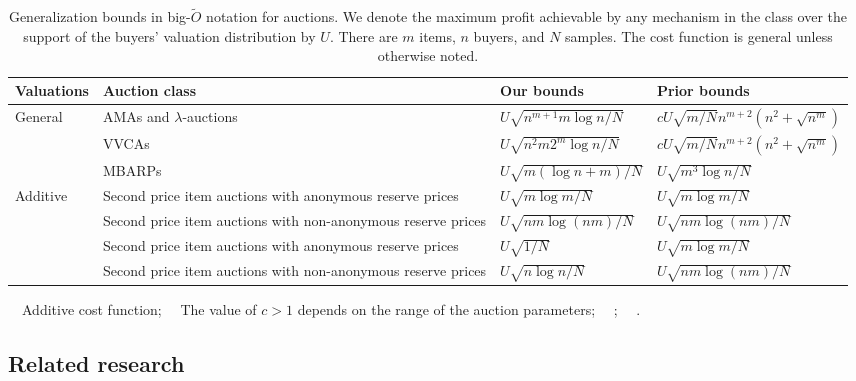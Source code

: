 \begin{table}
	\scriptsize
	\begin{tabularx}{\textwidth}{L{1} L{1} L{.9} L{1.1}}
		\toprule
		\textbf{Valuations} & \textbf{Auction class} & \textbf{Our bounds} & \textbf{Prior bounds}\\\midrule
		General & AMAs and $\lambda$-auctions & $U\sqrt{n^{m+1}m\log n/N}$ & $cU\sqrt{m/N} n^{m+2}\left(n^2 + \sqrt{n^m}\right)$\footnotemark[5]\footnotemark[6]\\
		& VVCAs & $U\sqrt{n^2m2^m\log n/N}$ & $cU\sqrt{m/N} n^{m+2}\left(n^2 + \sqrt{n^m}\right)$\footnotemark[5]\footnotemark[6]\\
		&MBARPs &$U \sqrt{m(\log n + m)/N}$&$U \sqrt{m^3 \log n/N}$\footnotemark[5]\\\midrule
		Additive & Second price item auctions with anonymous reserve prices &$U\sqrt{m \log m/N}$ &$U\sqrt{m \log m/N}$\footnotemark[4]\\
		& Second price item auctions with non-anonymous reserve prices &$U\sqrt{nm \log (nm)/N} $ &$U\sqrt{nm \log (nm)/N}$\footnotemark[4]\\\midrule
		 & Second price item auctions with anonymous reserve prices &$U\sqrt{1/N}$ &$U\sqrt{m \log m/N}$\footnotemark[4]\\
		& Second price item auctions with non-anonymous reserve prices &$U\sqrt{n \log n/N} $ &$U\sqrt{nm \log (nm)/N}$\footnotemark[4]\\\bottomrule
	\end{tabularx}
	\noindent\par
	{\center
		\scriptsize
		\footnotemark[1]~~{Additive cost function};\quad
		\footnotemark[6]~~{The value of $c > 1$ depends on the range of the auction parameters};\quad
		\footnotemark[4]~~{\citet{Morgenstern16:Learning}};\quad
		\footnotemark[5]~~{\citet{Balcan16:Sample}}.
	}
	\caption{Generalization bounds in big-$\tilde O$ notation for auctions. We denote the maximum profit achievable by any mechanism in the class over the support of the buyers' valuation distribution by $U$. There are $m$ items, $n$ buyers, and $N$ samples. The cost function is general unless otherwise noted.}\label{tab:results_auctions}
\end{table}%



\subsection{Related research}\label{sec:related}
